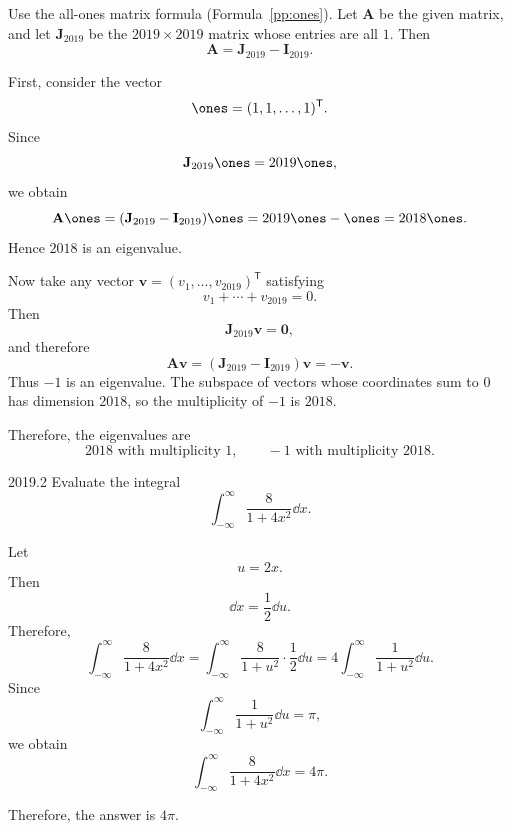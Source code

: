     \begin{solution}
        Use the all-ones matrix formula (Formula~\ref{pp:ones}). Let $\mathbf{A}$ be the given matrix, and let $\mathbf{J}_{2019}$ be the $2019\times 2019$ matrix
        whose entries are all $1$. Then
        \[
            \mathbf{A}=\mathbf{J}_{2019}-\mathbf{I}_{2019}.
        \]

        First, consider the vector
        \[
            \ones=(1,1,\dots,1)^{\mathsf T}.
        \]
        Since
        \[
            \mathbf{J}_{2019}\ones=2019\ones,
        \]
        we obtain
        \[
            \mathbf{A}\ones
            =
            (\mathbf{J}_{2019}-\mathbf{I}_{2019})\ones
            =
            2019\ones-\ones
            =
            2018\ones.
        \]
        Hence $2018$ is an eigenvalue.

        Now take any vector $\mathbf{v}=(v_1,\dots,v_{2019})^{\mathsf T}$ satisfying
        \[
            v_1+\cdots+v_{2019}=0.
        \]
        Then
        \[
            \mathbf{J}_{2019}\mathbf{v}=\mathbf{0},
        \]
        and therefore
        \[
            \mathbf{A}\mathbf{v}
            =
            (\mathbf{J}_{2019}-\mathbf{I}_{2019})\mathbf{v}
            =
            -\mathbf{v}.
        \]
        Thus $-1$ is an eigenvalue. The subspace of vectors whose coordinates sum to $0$ has
        dimension $2018$, so the multiplicity of $-1$ is $2018$.

        Therefore, the eigenvalues are
        \[
            \boxed{2018 \text{ with multiplicity } 1,\qquad -1 \text{ with multiplicity } 2018}.
        \]
    \end{solution}

    \begin{pastproblem}{2019.2}
        Evaluate the integral
        \[
            \int_{-\infty}^{\infty}
            \frac{8}{1+4x^2}\dd x.
        \]
    \end{pastproblem}

    \begin{solution}
        Let
        \[
            u=2x.
        \]
        Then
        \[
            \dd x=\frac{1}{2}\dd u.
        \]
        Therefore,
        \[
            \int_{-\infty}^{\infty}
            \frac{8}{1+4x^2}\dd x
            =
            \int_{-\infty}^{\infty}
            \frac{8}{1+u^2}\cdot\frac{1}{2}\dd u
            =
            4\int_{-\infty}^{\infty}
            \frac{1}{1+u^2}\dd u.
        \]
        Since
        \[
            \int_{-\infty}^{\infty}
            \frac{1}{1+u^2}\dd u
            =
            \pi,
        \]
        we obtain
        \[
            \int_{-\infty}^{\infty}
            \frac{8}{1+4x^2}\dd x
            =
            4\pi.
        \]

        Therefore, the answer is $\boxed{4\pi}$.
    \end{solution}

